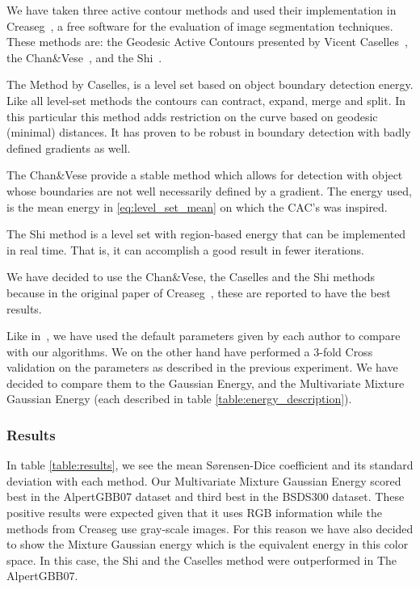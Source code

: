 We have taken three active contour methods and used their implementation in Creaseg~\cite{5652991}, a free software for the evaluation of image segmentation techniques. These methods are: the Geodesic Active Contours presented by Vicent Caselles~\cite{Caselles1993}, the Chan\&Vese~\cite{ChanVese}, and the Shi~\cite{4480128}.

The Method by Caselles, is a level set based on object boundary detection energy. Like all level-set methods the contours can contract, expand, merge and split. In this particular this method adds restriction on the curve based on geodesic (minimal) distances. It has proven to be robust in boundary detection with badly defined gradients as well.

The Chan\&Vese provide a stable method which allows for detection with object whose boundaries are not well necessarily defined by a gradient. The energy used, is the mean energy in \eqref{eq:level_set_mean} on which the CAC's was inspired.

The Shi method is a level set with region-based energy that can be implemented in real time. That is, it can accomplish a good result in fewer iterations.

We have decided to use the Chan\&Vese, the Caselles and the Shi methods because in the original paper of Creaseg~\cite{5652991}, these are reported to have the best results.

Like in~\cite{5652991}, we have used the default parameters given by each author to compare with our algorithms. We on the other hand have performed a 3-fold Cross validation on the parameters as described in the previous experiment. We have decided to compare them to the Gaussian Energy, and the Multivariate Mixture Gaussian Energy (each described in table \ref{table:energy_description}).

\subsubsection{Results}

In table \ref{table:results}, we see the mean S\o rensen-Dice coefficient and its standard deviation with each method. Our Multivariate Mixture Gaussian Energy scored best in the AlpertGBB07 dataset and third best in the BSDS300 dataset. These positive results were expected given that it uses RGB information while the methods from Creaseg use gray-scale images. For this reason we have also decided to show the Mixture Gaussian energy which is the equivalent energy in this color space. In this case, the Shi and the Caselles method were outperformed in The AlpertGBB07.

